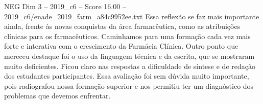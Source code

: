 \begin{textsample}{NEG Dim 3 – 2019\_c6 – Score 16.00 – 2019\_c6/enade\_2019\_farm\_a84c9952ee.txt}
Essa reflexão se faz mais importante ainda, frente às novas conquistas da área farmacêutica, como as atribuições clínicas para os farmacêuticos.
Caminhamos para uma formação cada vez mais forte e interativa com o crescimento da Farmácia Clínica.
Outro ponto que mereceu destaque foi o uso da linguagem técnica e da escrita, que se mostraram muito deficientes.
Ficou claro nas respostas a dificuldade de síntese e de redação dos estudantes participantes.
Essa avaliação foi sem dúvida muito importante, pois radiografou nossa formação superior e nos permitiu ter um diagnóstico dos problemas que devemos enfrentar.

\end{textsample}
